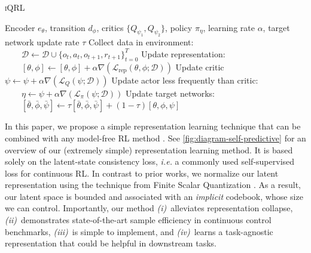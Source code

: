 \documentclass{article}
\makeatletter
\theoremstyle{plain}
\theoremstyle{definition}
\theoremstyle{remark}
\newcommand{\our}{\textsc{iQRL}\xspace}
\newcommand{\ie}{\textit{i.e.\@}\xspace}
\makeatother
\begin{document}
\begin{algorithm}[tb]
   \caption{\our}
   \label{alg:main_alg}
   \renewcommand{\algorithmiccomment}[1]{\hfill\textcolor{gray}{\(\triangleright\) #1}}
\begin{algorithmic}
    Encoder $e_{\theta}$, transition $d_{\phi}$, critics $\{Q_{\psi_{1}}, Q_{\psi_{2}} \}$, policy $\pi_{\eta}$, learning rate $\alpha$, target network update rate $\tau$
    \STATE Collect data in environment:
    \STATE $\qquad \mathcal{D} \leftarrow \mathcal{D} \cup \{o_{t}, a_{t}, o_{t+1}, r_{t+1}\}^{T}_{t=0}$
        \STATE Update representation:
        \STATE $\qquad [\theta, \phi] \leftarrow [\theta, \phi] + \alpha \nabla \left( \mathcal{L}_{\text{rep}}(\theta, \phi; \mathcal{D}) \right)$  
        \STATE Update critic
        \STATE \quad \quad $\psi \leftarrow \psi + \alpha \nabla \left( \mathcal{L}_{Q}(\psi; \mathcal{D}) \right)$ 
          \STATE Update actor less frequently than critic:
          \STATE $\quad \quad \eta \leftarrow \psi + \alpha \nabla \left( \mathcal{L}_{\pi}(\psi; \mathcal{D}) \right)$  
        \ENDIF
        \STATE Update target networks:
        \STATE $\quad \quad [\bar{\theta}, \bar{\phi}, \bar{\psi}] \leftarrow \tau [\bar{\theta}, \bar{\phi}, \bar{\psi}] + (1-\tau) [{\theta}, {\phi}, {\psi}]$
    \ENDFOR
   \ENDFOR
\end{algorithmic}
\end{algorithm}


In this paper, we propose a simple representation learning technique that can be combined with any model-free RL method
\citep[we use TD3][]{fujimotoAddressingFunctionApproximation2018}.
See \cref{fig:diagram-self-predictive} for an overview of our (extremely simple) representation learning method.
It is based solely on the latent-state consistency loss, \ie a commonly used self-supervised loss for continuous RL.
In contrast to prior works, we normalize our latent representation using the technique from Finite Scalar Quantization
\citep{mentzerFiniteScalarQuantization2023}.
As a result, our latent space is bounded and associated with an \emph{implicit} codebook, whose size we can control.
Importantly, our method {\em (i)}~alleviates representation collapse,
{\em (ii)}~demonstrates state-of-the-art sample efficiency in continuous control benchmarks,
{\em (iii)}~is simple to implement, and {\em (iv)}~learns a task-agnostic
representation that could be helpful in downstream tasks.
\end{document}

